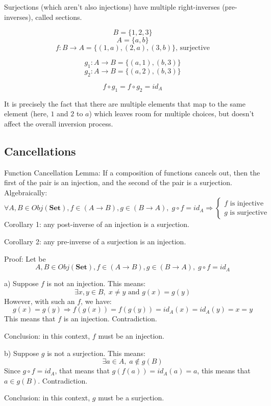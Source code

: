 \documentclass[12pt, letterpaper, twoside]{report}
\begin{document}
Surjections (which aren't also injections) have multiple right-inverses (pre-inverses), called sections.



$$B = \{ 1, 2, 3 \}$$
$$A = \{ a, b    \}$$
$$f : B \to A = \{ (1, a), (2, a), (3, b) \} \text{, surjective}$$

$$g_1 : A \to B = \{(a, 1), (b, 3) \}$$
$$g_2 : A \to B = \{(a, 2), (b, 3) \}$$

$$f \circ g_1 = f \circ g_2 = id_A$$

It is precisely the fact that there are multiple elements that map to the same element (here, $1$ and $2$ to $a$) which leaves room for multiple choices, but doesn't affect the overall inversion process.



\subsection*{Cancellations}

Function Cancellation Lemma: If a composition of functions cancels out, then the first of the pair is an injection, and the second of the pair is a surjection. Algebraically:
$$
\forall A, B \in Obj(\textbf{Set}),
f \in (A \to B), g \in (B \to A), \;
	g \circ f = id_A
\Rightarrow
	\begin{cases}
		f \text{ is injective} \\
		g \text{ is surjective}
	\end{cases}
$$
Corollary 1: any post-inverse of an injection is a surjection.

Corollary 2: any pre-inverse of a surjection is an injection.

Proof: Let be 
$$A, B \in Obj(\textbf{Set}), f \in (A \to B), g \in (B \to A), \; g \circ f = id_A$$

a) Suppose $f$ is not an injection. This means:
$$\exists x, y \in B, \; x \neq y \text{ and } g(x) = g(y)$$
However, with such an $f$, we have:
$$g(x) = g(y) \Rightarrow f(g(x)) = f(g(y)) = id_A(x) = id_A(y) = x = y$$
This means that $f$ is an injection. Contradiction.

Conclusion: in this context, $f$ must be an injection.

b) Suppose $g$ is not a surjection. This means:
$$\exists a \in A, \; a \notin g(B)$$
Since $g \circ f = id_A$, that means that $g(f(a)) = id_A(a) = a$, this means that $a \in g(B)$. Contradiction.

Conclusion: in this context, $g$ must be a surjection.
\end{document}
